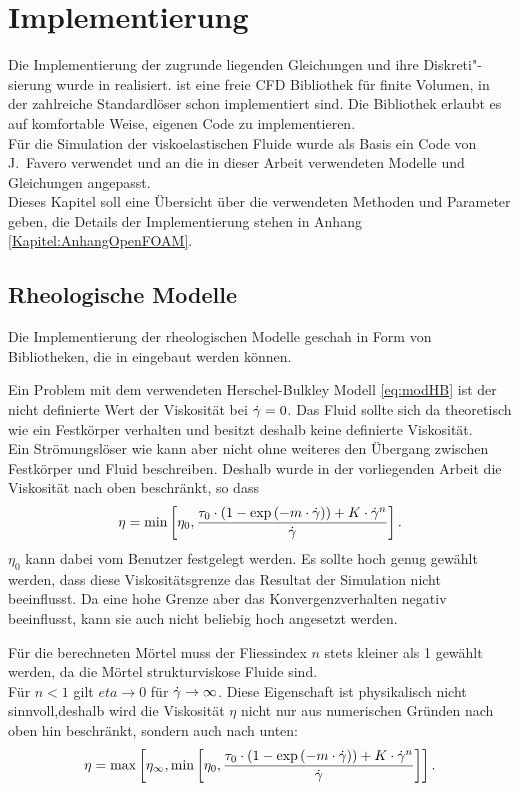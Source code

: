 \section{Implementierung}
\label{Kapitel:Implementierung}
Die Implementierung der zugrunde liegenden Gleichungen und ihre Diskreti"-sierung wurde in \openfoam{} \cite{openfoam} realisiert.
\openfoam{} ist eine freie CFD Bibliothek für finite Volumen, in der zahlreiche Standardlöser schon implementiert sind. Die Bibliothek erlaubt es auf komfortable Weise, eigenen Code zu implementieren.\\
Für die Simulation der viskoelastischen Fluide wurde als Basis ein Code von J.~Favero \cite{faveroOF} verwendet und an die in dieser Arbeit verwendeten Modelle und Gleichungen angepasst.\\
Dieses Kapitel soll eine Übersicht über die verwendeten Methoden und Parameter geben, die Details der Implementierung stehen in Anhang \ref{Kapitel:AnhangOpenFOAM}.

\subsection{Rheologische Modelle}
Die Implementierung der rheologischen Modelle geschah in Form von Bibliotheken, die in \openfoam{} eingebaut werden können.

Ein Problem mit dem verwendeten Herschel-Bulkley Modell \eqref{eq:modHB} ist der nicht definierte Wert der Viskosität bei $\dot\gamma=0$.
Das Fluid sollte sich da theoretisch wie ein Festkörper verhalten und besitzt deshalb keine definierte Viskosität.\\
Ein Strömungslöser wie \openfoam{} kann aber nicht ohne weiteres den Übergang zwischen Festkörper und Fluid beschreiben. Deshalb wurde in der vorliegenden Arbeit die Viskosität nach oben beschränkt, so dass
%
\begin{equation}
    \eta = \min \left[ \eta_0, \frac{\tau_0\cdot\left(1-\exp\left( -m\cdot\dot\gamma \right)\right)+K\cdot \dot\gamma^n}{\dot\gamma} \right].
\end{equation}
%
$\eta_0$ kann dabei vom Benutzer festgelegt werden. Es sollte hoch genug gewählt werden, dass diese Viskositätsgrenze das Resultat der Simulation nicht beeinflusst. Da eine hohe Grenze aber das Konvergenzverhalten negativ beeinflusst, kann sie auch nicht beliebig hoch angesetzt werden.

Für die berechneten Mörtel muss der Fliessindex $n$ stets kleiner als 1 gewählt werden, da die Mörtel strukturviskose Fluide sind.\\
Für $n<1$ gilt $eta\rightarrow0$ für $\dot\gamma\rightarrow\infty$. Diese Eigenschaft ist physikalisch nicht sinnvoll,deshalb wird die Viskosität $\eta$ nicht nur aus numerischen Gründen nach oben hin beschränkt, sondern auch nach unten:
%
\begin{equation}
    \eta = \max \left[ \eta_\infty, \min \left[ \eta_0, \frac{\tau_0\cdot\left(1-\exp\left( -m\cdot\dot\gamma \right)\right)+K\cdot \dot\gamma^n}{\dot\gamma} \right]\right].
\end{equation}
%

